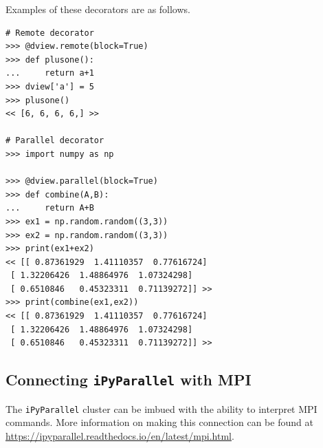 Examples of these decorators are as follows.

\begin{lstlisting}
# Remote decorator
>>> @dview.remote(block=True)
>>> def plusone():
...     return a+1
>>> dview['a'] = 5
>>> plusone()
<< [6, 6, 6, 6,] >>

# Parallel decorator
>>> import numpy as np

>>> @dview.parallel(block=True)
>>> def combine(A,B):
...     return A+B
>>> ex1 = np.random.random((3,3))
>>> ex2 = np.random.random((3,3))
>>> print(ex1+ex2)
<< [[ 0.87361929  1.41110357  0.77616724]
 [ 1.32206426  1.48864976  1.07324298]
 [ 0.6510846   0.45323311  0.71139272]] >>
>>> print(combine(ex1,ex2))
<< [[ 0.87361929  1.41110357  0.77616724]
 [ 1.32206426  1.48864976  1.07324298]
 [ 0.6510846   0.45323311  0.71139272]] >>
 \end{lstlisting}

\subsection*{Connecting \texttt{iPyParallel} with MPI}
The \texttt{iPyParallel} cluster can be imbued with the ability to interpret MPI commands.
More information on making this connection can be found at \url{https://ipyparallel.readthedocs.io/en/latest/mpi.html}.


